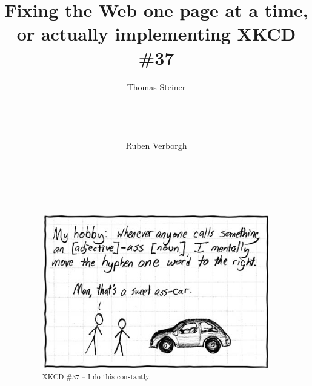 \documentclass{acm_proc_article-sp}
\begin{document}
\title{Fixing the Web one page at a time,\\ or actually implementing XKCD \#37}

\author{
\alignauthor
Thomas Steiner\\
	\\
	\\
	\\
	\\
\alignauthor
Ruben Verborgh\\
	\\
	\\
	\\
	\\
}
\maketitle

\begin{abstract}
\begin{figure}[h!]
\centering
\includegraphics[width=\columnwidth]{hyphen.jpg}
\caption{XKCD \#37 -- I do this constantly.}
\label{fig:xkcd37}
\end{figure}
\end{abstract}

\end{document}
